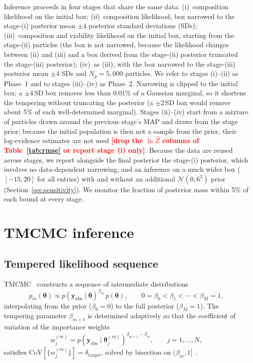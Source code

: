 \documentclass[11pt,a4paper]{article}
\newcommand{\btheta}{\boldsymbol{\theta}}
\newcommand{\yobs}{\mathbf{y}_{\mathrm{obs}}}
\newcommand{\TBD}[1]{\textcolor{red}{\textbf{[#1]}}}
\begin{document}
Inference proceeds in four stages that share the same data:
(i)~composition likelihood on the initial box;
(ii)~composition likelihood, box narrowed to the stage-(i) posterior mean $\pm4$ posterior standard deviations (SDs);
(iii)~composition and viability likelihood on the initial box, starting from the stage-(ii) particles (the box is not narrowed, because the likelihood changes between (ii) and (iii) and a box derived from the stage-(ii) posterior truncated the stage-(iii) posterior);
(iv)~as (iii), with the box narrowed to the stage-(iii) posterior mean $\pm4$ SDs and $N_p=5{,}000$ particles.
We refer to stages (i)--(ii) as Phase~1 and to stages (iii)--(iv) as Phase~2.
Narrowing is clipped to the initial box; a $\pm4$\,SD box removes less than 0.01\% of a Gaussian marginal, so it shortens the tempering without truncating the posterior (a $\pm2$\,SD box would remove about 5\% of each well-determined marginal). Stages (ii)--(iv) start from a mixture of particles drawn around the previous stage's MAP and draws from the stage prior; because the initial population is then not a sample from the prior, their log-evidence estimates are not used \TBD{drop the $\ln\hat{Z}$ columns of Table~\ref{tab:rmse} or report stage (i) only}.
Because the data are reused across stages, we report alongside the final posterior the stage-(i) posterior, which involves no data-dependent narrowing, and an inference on a much wider box ($[-15,20]$ for all entries) with and without an additional $\mathcal{N}(0,6^2)$ prior (Section~\ref{sec:sensitivity}).
We monitor the fraction of posterior mass within 5\% of each bound at every stage.

\section{TMCMC inference}
\label{sec:tmcmc}

\subsection{Tempered likelihood sequence}

TMCMC~\cite{ChingChen2007TMCMC, DelMoral2006SMC, Chopin2002SMC} constructs a sequence of intermediate distributions
\begin{equation}
p_m(\btheta) \propto p(\yobs\mid\btheta)^{\beta_m}\,p(\btheta),
\qquad
0=\beta_0<\beta_1<\cdots<\beta_M=1,
\label{eq:tempered}
\end{equation}
interpolating from the prior ($\beta_0=0$) to the full posterior ($\beta_M=1$).
The tempering parameter $\beta_{m+1}$ is determined adaptively so that the coefficient of variation of the importance weights
\begin{equation}
w_j^{(m)} = p(\yobs\mid\btheta_j^{(m)})^{\beta_{m+1}-\beta_m},
\qquad j=1,\dots,N,
\label{eq:weights}
\end{equation}
satisfies $\mathrm{CoV}[\{w_j^{(m)}\}]=\delta_{\mathrm{target}}$, solved by bisection on $(\beta_m,1]$~\cite{Betz2016TMCMC}.
\end{document}
